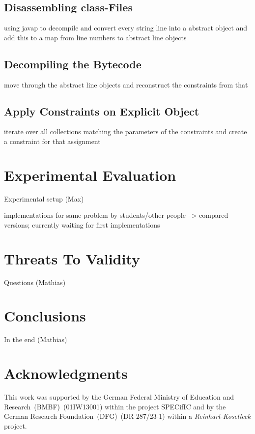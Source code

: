 \documentclass[conference]{IEEEtran}
\begin{document}
\subsection{Disassembling class-Files}
\label{sec:impl_disassembling}

\danger using javap to decompile and convert every string line into a abstract
object and add this to a map from line numbers to abstract line objects

\subsection{Decompiling the Bytecode}
\label{sec:impl_decompiling}

\danger move through the abstract line objects and reconstruct the constraints
from that

\subsection{Apply Constraints on Explicit Object}
\label{sec:impl_applying}

\danger iterate over all collections matching the parameters of the constraints
and create a constraint for that assignment

\section{Experimental Evaluation}
\label{sec:exper-eval}

\danger Experimental setup (Max)

\danger implementations for same problem by students/other people --> compared
versions; currently waiting for first implementations

\section{Threats To Validity}
\label{sec:threats-validity}

\danger Questions (Mathias)

\section{Conclusions}
\label{sec:conclusions}

\danger In the end (Mathias)

\section*{Acknowledgments}
\label{sec:acknowledgments}
This work was supported by the German Federal Ministry of Education and
Research~(BMBF)~(01IW13001) within the project SPECifIC and by the German
Research Foundation~(DFG)~(DR 287/23-1) within a \emph{Reinhart-Koselleck}
project.




\end{document}
